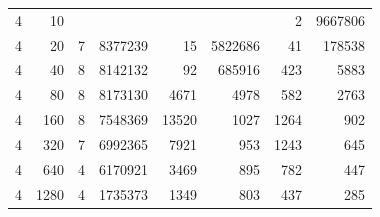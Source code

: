 \begin{table}[p]
\begin{minipage}[c]{0.49\textwidth}
\begin{tabular}{|rr|rr|rr|rr|}
\num{4} &   \num{10} &         &               &             &               &    \num{2} & \num{9667806} \\
\num{4} &   \num{20} & \num{7} & \num{8377239} &    \num{15} & \num{5822686} &   \num{41} &  \num{178538} \\
\num{4} &   \num{40} & \num{8} & \num{8142132} &    \num{92} &  \num{685916} &  \num{423} &    \num{5883} \\
\num{4} &   \num{80} & \num{8} & \num{8173130} &  \num{4671} &    \num{4978} &  \num{582} &    \num{2763} \\
\num{4} &  \num{160} & \num{8} & \num{7548369} & \num{13520} &    \num{1027} & \num{1264} &     \num{902} \\
\num{4} &  \num{320} & \num{7} & \num{6992365} &  \num{7921} &     \num{953} & \num{1243} &     \num{645} \\
\num{4} &  \num{640} & \num{4} & \num{6170921} &  \num{3469} &     \num{895} &  \num{782} &     \num{447} \\
\num{4} & \num{1280} & \num{4} & \num{1735373} &  \num{1349} &     \num{803} &  \num{437} &     \num{285} \\
\hline

\end{tabular}
\end{minipage}
\end{table}

